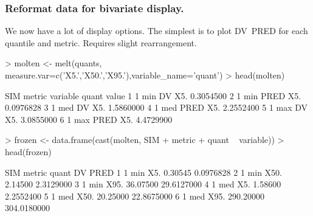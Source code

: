\subsubsection{Reformat data for bivariate display.}
We now have a lot of display options.  The simplest is to plot DV~PRED for each quantile and metric.
Requires slight rearrangement.
\begin{Schunk}
\begin{Sinput}
> molten <- melt(quants, measure.var=c('X5.','X50.','X95.'),variable_name='quant')
> head(molten)
\end{Sinput}
\begin{Soutput}
  SIM metric variable quant     value
1   1    min       DV   X5. 0.3054500
2   1    min     PRED   X5. 0.0976828
3   1    med       DV   X5. 1.5860000
4   1    med     PRED   X5. 2.2552400
5   1    max       DV   X5. 3.0855000
6   1    max     PRED   X5. 4.4729900
\end{Soutput}
\begin{Sinput}
> frozen <- data.frame(cast(molten, SIM + metric + quant ~ variable))
> head(frozen)
\end{Sinput}
\begin{Soutput}
  SIM metric quant        DV        PRED
1   1    min   X5.   0.30545   0.0976828
2   1    min  X50.   2.14500   2.3129000
3   1    min  X95.  36.07500  29.6127000
4   1    med   X5.   1.58600   2.2552400
5   1    med  X50.  20.25000  22.8675000
6   1    med  X95. 290.20000 304.0180000
\end{Soutput}
\end{Schunk}
